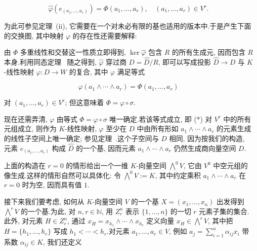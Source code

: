 \[
\hat{\varphi}\left(e_{(a_1, \ldots, a_r)}\right) = \Phi(a_1, \ldots, a_r), \quad (a_1, \ldots, a_r) \in V^r.
\]

为此可参见定理~(ii), 它需要在一个对未必有限的基也适用的版本中.于是产生下面的交换图, 其中映射 $\varphi$ 的存在性还需要解释:

\begin{center}
\end{center}

由 $\Phi$ 多重线性和交替这一性质立即得到, $\ker \hat{\varphi}$ 包含 $R$ 的所有生成元, 因而包含 $R$ 本身.利用同态定理~ 随之得到, $\hat{\varphi}$ 穿过商 $D = \hat{D} / R$, 即可以写成投影 $\hat{D} \longrightarrow D$ 与 $K$-线性映射 $\varphi \colon D \longrightarrow W$ 的复合, 其中 $\varphi$ 满足等式

\begin{equation}
\varphi(a_1 \wedge \cdots \wedge a_r) = \Phi(a_1, \ldots, a_r) \tag{$\ast$}
\end{equation}

对 $(a_1, \ldots, a_r) \in V^r$; 但这意味着 $\Phi = \varphi \circ \sigma$.

现在还需弄清, $\varphi$ 由等式 $\Phi = \varphi \circ \sigma$ 唯一确定.若该等式成立, 即 ($\ast$) 对 $V^r$ 中的所有元组成立, 则作为 $K$-线性映射, $\varphi$ 至少在 $D$ 中由所有形如 $a_1 \wedge \cdots \wedge a_r$ 的元素生成的线性子空间上唯一确定; 参见定理~.这个子空间与 $D$ 相同, 因为按我们的构造, 元素 $e_{(a_1, \ldots, a_r)}$ 构成 $\hat{D}$ 的一个基, 因而元素 $a_1 \wedge \cdots \wedge a_r$ 仍然生成商向量空间 $D$.

上面的构造在 $r = 0$ 的情形给出一个一维 $K$-向量空间 $\bigwedge^0 V$, 它由 $V^0$ 中空元组的像生成.这样的情形自然可以具体化: 令 $\bigwedge^0 V := K$, 其中约定乘积 $a_1 \wedge \cdots \wedge a_r$ 在 $r = 0$ 时为空, 因而具有值 $1$.

接下来我们要考虑, 如何从 $K$-向量空间 $V$ 的一个基 $X = (x_1, \ldots, x_n)$ 出发得到 $\bigwedge^r V$ 的一个基.为此, 对 $n, r \in \mathbb{N}$, 用 $Z_r^n$ 表示 $\{1, \ldots, n\}$ 的一切 $r$ 元素子集的集合.此外, 对元素 $H \in Z_r^n$, 通过 $x_H = x_{h_1} \wedge \cdots \wedge x_{h_r}$ 定义向量 $x_H \in \bigwedge^r V$, 其中把 $H = \{h_1, \ldots, h_r\}$ 写成 $h_1 < \cdots < h_r$.对元素 $a_1, \ldots, a_r \in V$, 例如 $a_j = \sum_{i = 1}^{n} \alpha_{ij} x_i$ 带系数 $\alpha_{ij} \in K$, 我们还定义

